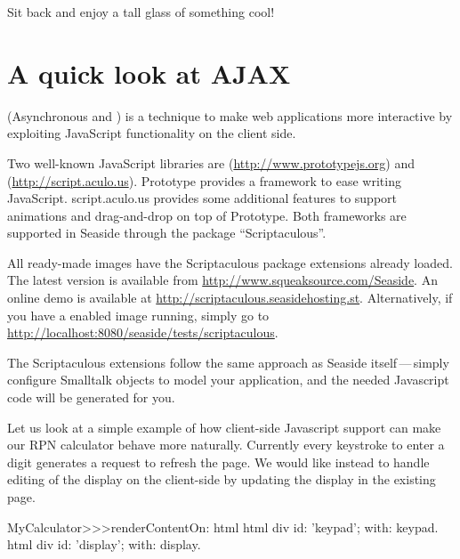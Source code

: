 \documentclass[a4paper,10pt,twoside]{book}
\begin{document}
Sit back and enjoy a tall glass of something cool!

\section{A quick look at AJAX}


 (Asynchronous  and ) is a technique to make web applications more interactive by exploiting JavaScript functionality on the client side.

Two well-known JavaScript libraries are  (\url{http://www.prototypejs.org}) and  (\url{http://script.aculo.us}).
Prototype provides a framework to ease writing JavaScript.
script.aculo.us provides some additional features to support animations and drag-and-drop on top of Prototype.
Both frameworks are supported in Seaside through the package ``Scriptaculous''.

All ready-made images have the Scriptaculous package extensions already loaded.
The latest version is available from \url{http://www.squeaksource.com/Seaside}.
An online demo is available at \url{http://scriptaculous.seasidehosting.st}.
Alternatively, if you have a enabled image running, simply go to \url{http://localhost:8080/seaside/tests/scriptaculous}.

The Scriptaculous extensions follow the same approach as Seaside itself\,---\,simply configure Smalltalk objects to model your application, and the needed Javascript code will be generated for you.

Let us look at a simple example of how client-side Javascript support can make our RPN calculator behave more naturally.
Currently every keystroke to enter a digit generates a request to refresh the page.
We would like instead to handle editing of the display on the client-side by updating the display in the existing page.


\begin{code}{}
MyCalculator>>>renderContentOn: html
	html div id: 'keypad'; with: keypad.
	html div id: 'display'; with: display.	
\end{code}
				
\end{document}
